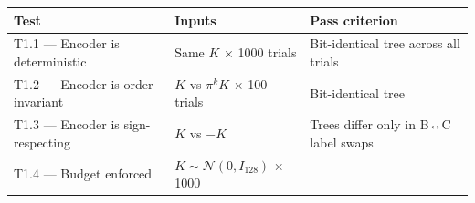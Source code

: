 \documentclass[
  11pt,
]{article}
\begin{document}
\begin{longtable}[]{@{}lll@{}}
\toprule
\begin{minipage}[b]{0.18\columnwidth}\raggedright
Test\strut
\end{minipage} & \begin{minipage}[b]{0.24\columnwidth}\raggedright
Inputs\strut
\end{minipage} & \begin{minipage}[b]{0.49\columnwidth}\raggedright
Pass criterion\strut
\end{minipage}\tabularnewline
\midrule
\endhead
\begin{minipage}[t]{0.18\columnwidth}\raggedright
T1.1 --- Encoder is deterministic\strut
\end{minipage} & \begin{minipage}[t]{0.24\columnwidth}\raggedright
Same \(K\) × 1000 trials\strut
\end{minipage} & \begin{minipage}[t]{0.49\columnwidth}\raggedright
Bit-identical tree across all trials\strut
\end{minipage}\tabularnewline
\begin{minipage}[t]{0.18\columnwidth}\raggedright
T1.2 --- Encoder is order-invariant\strut
\end{minipage} & \begin{minipage}[t]{0.24\columnwidth}\raggedright
\(K\) vs \(\pi^k K\) × 100 trials\strut
\end{minipage} & \begin{minipage}[t]{0.49\columnwidth}\raggedright
Bit-identical tree\strut
\end{minipage}\tabularnewline
\begin{minipage}[t]{0.18\columnwidth}\raggedright
T1.3 --- Encoder is sign-respecting\strut
\end{minipage} & \begin{minipage}[t]{0.24\columnwidth}\raggedright
\(K\) vs \(-K\)\strut
\end{minipage} & \begin{minipage}[t]{0.49\columnwidth}\raggedright
Trees differ only in B↔C label swaps\strut
\end{minipage}\tabularnewline
\begin{minipage}[t]{0.18\columnwidth}\raggedright
T1.4 --- Budget enforced\strut
\end{minipage} & \begin{minipage}[t]{0.24\columnwidth}\raggedright
\(K \sim \mathcal{N}(0, I_{128})\) × 1000\strut

\end{minipage}
\end{longtable}
\end{document}
